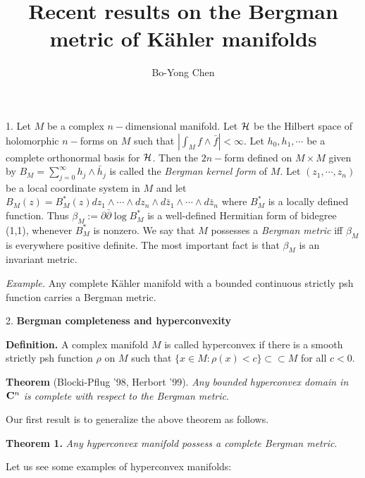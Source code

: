 \documentclass[12pt]{article}
\begin{document}
\title{Recent results on the Bergman metric of K\"ahler manifolds}
\author{Bo-Yong Chen}
\date{}
\maketitle


1. Let $M$ be a complex $n-$dimensional manifold. Let ${\cal H}$
be the Hilbert space of holomorphic $n-$forms on $M$ such that
$|\int_Mf\wedge \bar f|<\infty $. Let $h_0,h_1,\cdots $ be a
complete orthonormal basis for ${\cal H}$. Then the $2n-$form defined on $%
M\times M$ given by $B_M=\sum_{j=0}^\infty h_j\wedge \bar h_j$ is
called the \emph{Bergman kernel form} of $M$. Let
$(z_1,\cdots,z_n)$ be a local coordinate system in $M$ and let
$B_M(z)=B_M^{*}(z)dz_1\wedge \cdots \wedge dz_n\wedge d\bar
z_1\wedge \cdots \wedge d\bar z_n$ where $B_M^{*}$ is a locally
defined function. Thus $\beta_M :=\partial \bar \partial \log
B_M^{*}$ is a well-defined
Hermitian form of bidegree (1,1), whenever $B_M^{*}$ is nonzero. We say that $%
M $ possesses a \emph{Bergman metric} iff $\beta_M $ is everywhere
positive definite. The most important fact is that $\beta_M$ is an
invariant metric.

\bigskip

\emph{Example.} Any complete K\"ahler manifold with a bounded
continuous strictly psh function carries a Bergman metric.

\bigskip

2. \textbf{Bergman completeness and hyperconvexity}

\bigskip

\textbf{Definition.} A complex manifold $M$ is called hyperconvex
if there is a smooth strictly psh function $\rho$ on $M$ such that
$\{x\in M:\rho(x)<c\}\subset\subset M$ for all $c<0$.

\bigskip

\textbf{Theorem} (Blocki-Pflug '98, Herbort '99). \emph{Any
bounded hyperconvex domain in ${\bf C}^n$ is complete with respect
to the Bergman metric}.

\bigskip

Our first result is to generalize the above theorem as follows.

\bigskip

\textbf{Theorem 1.} \emph{Any hyperconvex manifold possess a
complete Bergman metric}.

\bigskip

Let us see some examples of hyperconvex manifolds:

\bigskip
\end{document}
